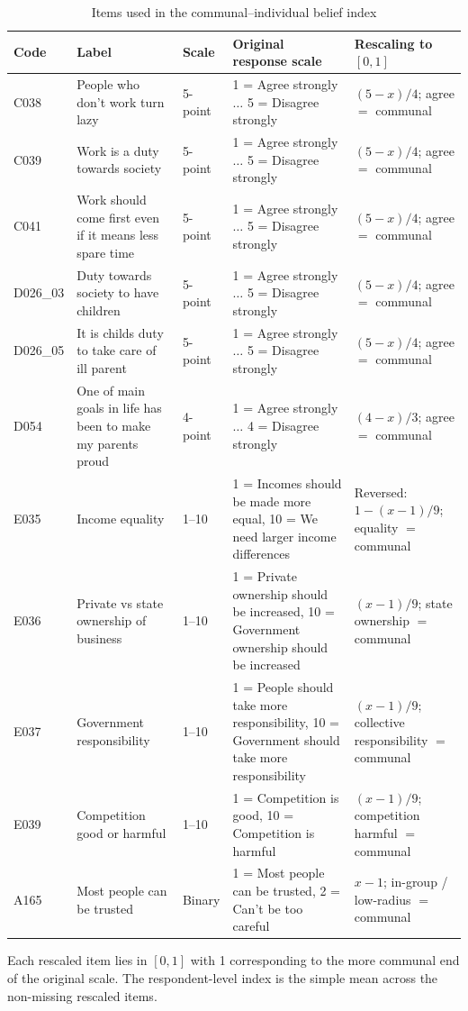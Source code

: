 \begin{table}[!htbp]\centering
\caption{Items used in the communal--individual belief index}
\label{tab:items_communal}
\footnotesize
\begin{threeparttable}
\begin{tabular}{p{0.9cm} p{4.3cm} p{1.0cm} p{5.0cm} p{3.2cm}}
\toprule
Code & Label & Scale & Original response scale & Rescaling to $[0,1]$ \\
\midrule
C038 & People who don't work turn lazy & 5-point & 1 = Agree strongly $\dots$ 5 = Disagree strongly & $(5-x)/4$; agree $=$ communal \\
C039 & Work is a duty towards society & 5-point & 1 = Agree strongly $\dots$ 5 = Disagree strongly & $(5-x)/4$; agree $=$ communal \\
C041 & Work should come first even if it means less spare time & 5-point & 1 = Agree strongly $\dots$ 5 = Disagree strongly & $(5-x)/4$; agree $=$ communal \\
D026\_03 & Duty towards society to have children & 5-point & 1 = Agree strongly $\dots$ 5 = Disagree strongly & $(5-x)/4$; agree $=$ communal \\
D026\_05 & It is childs duty to take care of ill parent & 5-point & 1 = Agree strongly $\dots$ 5 = Disagree strongly & $(5-x)/4$; agree $=$ communal \\
D054 & One of main goals in life has been to make my parents proud & 4-point & 1 = Agree strongly $\dots$ 4 = Disagree strongly & $(4-x)/3$; agree $=$ communal \\
E035 & Income equality & 1--10 & 1 = Incomes should be made more equal, 10 = We need larger income differences & Reversed: $1-(x-1)/9$; equality $=$ communal \\
E036 & Private vs state ownership of business & 1--10 & 1 = Private ownership should be increased, 10 = Government ownership should be increased & $(x-1)/9$; state ownership $=$ communal \\
E037 & Government responsibility & 1--10 & 1 = People should take more responsibility, 10 = Government should take more responsibility & $(x-1)/9$; collective responsibility $=$ communal \\
E039 & Competition good or harmful & 1--10 & 1 = Competition is good, 10 = Competition is harmful & $(x-1)/9$; competition harmful $=$ communal \\
A165 & Most people can be trusted & Binary & 1 = Most people can be trusted, 2 = Can't be too careful & $x-1$; in-group / low-radius $=$ communal \\
\bottomrule
\end{tabular}
\begin{tablenotes}\footnotesize
\item Each rescaled item lies in $[0,1]$ with 1 corresponding to the more
communal end of the original scale. The respondent-level index is the simple
mean across the non-missing rescaled items.
\end{tablenotes}
\end{threeparttable}
\end{table}

